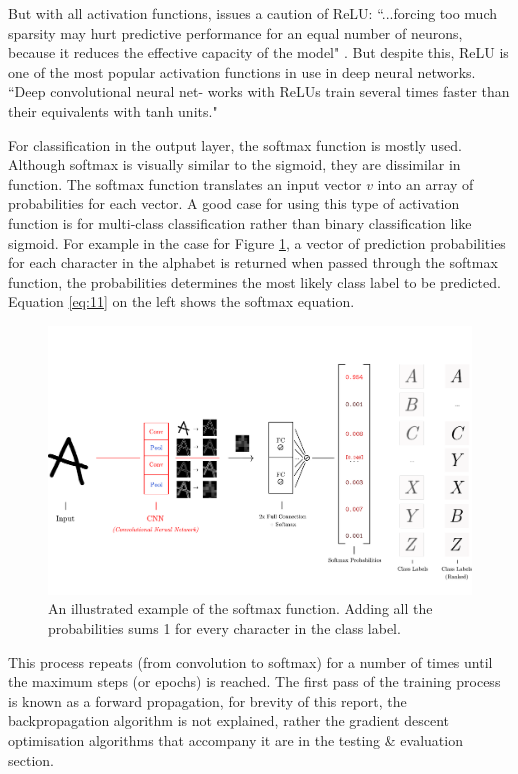 \documentclass[report, 11pt, oneside]{dissertation}
\begin{document}
But with all activation functions, \citep{Glorot:2011tm} issues a caution of ReLU: ``...forcing too much sparsity may hurt predictive performance for an equal number of neurons, because it reduces the effective capacity of the model" \citep[316]{Glorot:2011tm}. But despite this, ReLU is one of the most popular activation functions in use in deep neural networks. ``Deep convolutional neural net- works with ReLUs train several times faster than their equivalents with tanh units." \citep{Krizhevsky2012}

For classification in the output layer, the softmax function is mostly used. Although softmax is visually similar to the sigmoid, they are dissimilar in function. The softmax function translates an input vector $ v $ into an array of probabilities for each vector. A good case for using this type of activation function is for multi-class classification rather than binary classification like sigmoid. For example in the case for Figure \ref{fig:softmax}, a vector of prediction probabilities for each character in the alphabet is returned when passed through the softmax function, the probabilities determines the most likely class label to be predicted. Equation \ref{eq:11} on the left shows the softmax equation.

\begin{figure}[!htb]
	\centering
	\includegraphics[scale=0.65]{figure_13.pdf}
	\caption[An illustrated example of the softmax function.]{An illustrated example of the softmax function. Adding all the probabilities sums 1 for every character in the class label.}
	\label{fig:softmax}
\end{figure}


This process repeats (from convolution to softmax) for a number of times until the maximum steps (or epochs) is reached. The first pass of the training process is known as a forward propagation, for brevity of this report, the backpropagation algorithm is not explained, rather the gradient descent optimisation algorithms that accompany it are in the testing \& evaluation section. 
\end{document}
